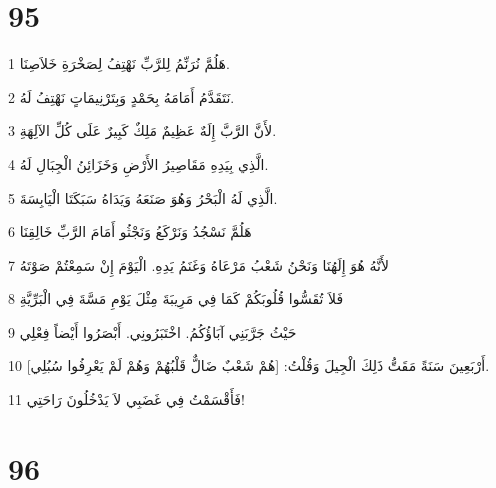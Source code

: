 \chapter{95}

\par 1 هَلُمَّ نُرَنِّمُ لِلرَّبِّ نَهْتِفُ لِصَخْرَةِ خَلاَصِنَا.
\par 2 نَتَقَدَّمُ أَمَامَهُ بِحَمْدٍ وَبِتَرْنِيمَاتٍ نَهْتِفُ لَهُ.
\par 3 لأَنَّ الرَّبَّ إِلَهٌ عَظِيمٌ مَلِكٌ كَبِيرٌ عَلَى كُلِّ الآلِهَةِ.
\par 4 الَّذِي بِيَدِهِ مَقَاصِيرُ الأَرْضِ وَخَزَائِنُ الْجِبَالِ لَهُ.
\par 5 الَّذِي لَهُ الْبَحْرُ وَهُوَ صَنَعَهُ وَيَدَاهُ سَبَكَتَا الْيَابِسَةَ.
\par 6 هَلُمَّ نَسْجُدُ وَنَرْكَعُ وَنَجْثُو أَمَامَ الرَّبِّ خَالِقِنَا
\par 7 لأَنَّهُ هُوَ إِلَهُنَا وَنَحْنُ شَعْبُ مَرْعَاهُ وَغَنَمُ يَدِهِ. الْيَوْمَ إِنْ سَمِعْتُمْ صَوْتَهُ
\par 8 فَلاَ تُقَسُّوا قُلُوبَكُمْ كَمَا فِي مَرِيبَةَ مِثْلَ يَوْمِ مَسَّةَ فِي الْبَرِّيَّةِ
\par 9 حَيْثُ جَرَّبَنِي آبَاؤُكُمُ. اخْتَبَرُونِي. أَبْصَرُوا أَيْضاً فِعْلِي
\par 10 أَرْبَعِينَ سَنَةً مَقَتُّ ذَلِكَ الْجِيلَ وَقُلْتُ: [هُمْ شَعْبٌ ضَالٌّ قَلْبُهُمْ وَهُمْ لَمْ يَعْرِفُوا سُبُلِي].
\par 11 فَأَقْسَمْتُ فِي غَضَبِي لاَ يَدْخُلُونَ رَاحَتِي!

\chapter{96}


